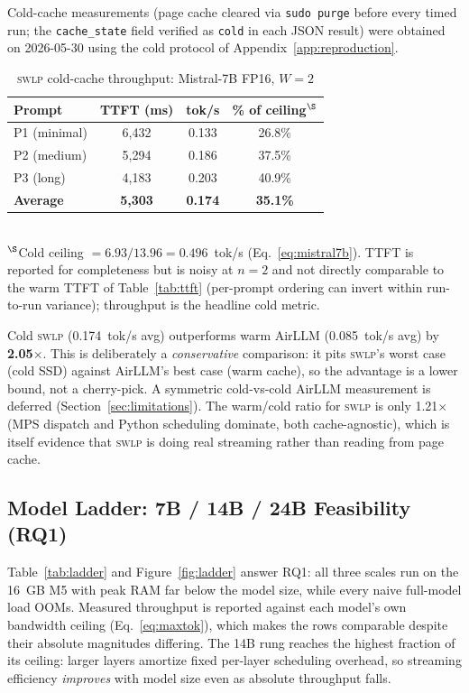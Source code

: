 \documentclass[10pt,a4paper]{article}
\newcommand{\swlp}{\textsc{swlp}}
\begin{document}
Cold-cache measurements (page cache cleared via \texttt{sudo purge} before every
timed run; the \texttt{cache\_state} field verified as \texttt{cold} in each JSON
result) were obtained on 2026-05-30 using the cold protocol of
Appendix~\ref{app:reproduction}.

\begin{table}[htbp]
\centering
\caption{\swlp{} cold-cache throughput: Mistral-7B FP16, $W=2$}
\label{tab:cold}
\begin{tabular}{@{}lccc@{}}
\toprule
\textbf{Prompt} & \textbf{TTFT (ms)} & \textbf{tok/s} & \textbf{\% of ceiling$^\S$} \\
\midrule
P1 (minimal) & 6{,}432 & 0.133 & 26.8\% \\
P2 (medium) & 5{,}294 & 0.186 & 37.5\% \\
P3 (long) & 4{,}183 & 0.203 & 40.9\% \\
\midrule
\textbf{Average} & \textbf{5{,}303} & \textbf{0.174} & \textbf{35.1\%} \\
\bottomrule
\end{tabular}
\\[0.3em]
{\small $^\S$Cold ceiling $= 6.93 / 13.96 = 0.496$~tok/s (Eq.~\ref{eq:mistral7b}).
TTFT is reported for completeness but is noisy at $n=2$ and not directly
comparable to the warm TTFT of Table~\ref{tab:ttft} (per-prompt ordering can
invert within run-to-run variance); throughput is the headline cold metric.}
\end{table}

Cold \swlp{} (0.174~tok/s avg) outperforms warm AirLLM (0.085~tok/s avg) by
\textbf{2.05$\times$}. This is deliberately a \emph{conservative} comparison: it
pits \swlp{}'s worst case (cold SSD) against AirLLM's best case (warm cache), so
the advantage is a lower bound, not a cherry-pick. A symmetric cold-vs-cold
AirLLM measurement is deferred (Section~\ref{sec:limitations}). The warm/cold
ratio for \swlp{} is only 1.21$\times$ (MPS dispatch and Python scheduling
dominate, both cache-agnostic), which is itself evidence that \swlp{} is doing
real streaming rather than reading from page cache.

\subsection{Model Ladder: 7B / 14B / 24B Feasibility (RQ1)}
\label{subsec:ladder}

Table~\ref{tab:ladder} and Figure~\ref{fig:ladder} answer RQ1: all three scales
run on the 16~GB M5 with peak RAM far below the model size, while every naive
full-model load OOMs. Measured throughput is reported against each model's own
bandwidth ceiling (Eq.~\ref{eq:maxtok}), which makes the rows comparable despite
their absolute magnitudes differing. The 14B rung reaches the highest fraction of
its ceiling: larger layers amortize fixed per-layer scheduling overhead, so
streaming efficiency \emph{improves} with model size even as absolute throughput
falls.
\end{document}
